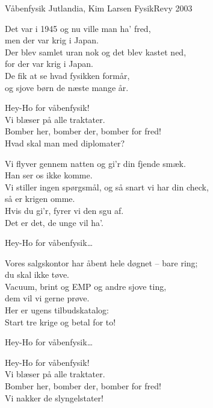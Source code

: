 \begin{song}{Våbenfysik}{}
  {Jutlandia, Kim Larsen}
  {}
  {FysikRevy 2003}
  {\NotCCLIed}

  \begin{SBVerse}
	Det var i 1945 og nu ville man ha’ fred,\\
	men der var krig i Japan.\\
	Der blev samlet uran nok og det blev kastet ned,\\
	for der var krig i Japan.\\
	De fik at se hvad fysikken formår,\\
	og sjove børn de næste mange år.
  \end{SBVerse}

  \begin{SBChorus}
	Hey-Ho for våbenfysik!\\
	Vi blæser på alle traktater.\\
	Bomber her, bomber der, bomber for fred!\\
	Hvad skal man med diplomater?
  \end{SBChorus}

  \begin{SBVerse}
	Vi flyver gennem natten og gi’r din fjende smæk.\\
	Han ser os ikke komme.\\
	Vi stiller ingen spørgsmål, og så snart vi har din check,\\
	så er krigen omme.\\
	Hvis du gi’r, fyrer vi den sgu af.\\
	Det er det, de unge vil ha’.
  \end{SBVerse}

  \begin{SBChorus}
  	Hey-Ho for våbenfysik\ldots
  \end{SBChorus}

  \begin{SBVerse}
	Vores salgskontor har åbent hele døgnet – bare ring;\\
	du skal ikke tøve.\\
	Vacuum, brint og EMP og andre sjove ting,\\
	dem vil vi gerne prøve.\\
	Her er ugens tilbudskatalog:\\
	Start tre krige og betal for to!
  \end{SBVerse}

  \begin{SBChorus}
  	Hey-Ho for våbenfysik\ldots
  \end{SBChorus}
  
  \begin{SBChorus}
	Hey-Ho for våbenfysik!\\
	Vi blæser på alle traktater.\\
	Bomber her, bomber der, bomber for fred!\\
	Vi nakker de slyngelstater!
  \end{SBChorus}

\end{song}